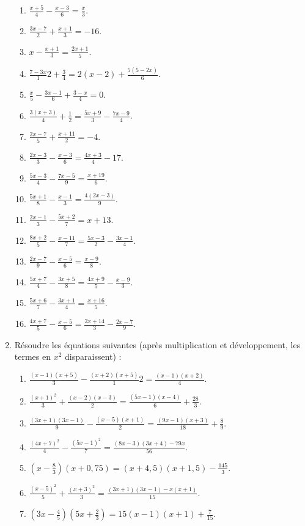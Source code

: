 \documentclass[12 pt]{extarticle}
\theoremstyle{plain}
\begin{document}
\begin{enumerate}
\begin{enumerate}
\item $\frac{x+5}4 - \frac{x-3}6 = \frac{x}3$. 
\item $\frac{3x-7}2 + \frac{x+1}3 = -16$. 
\item $x-\frac{x+1}3 = \frac{2x+1}5$. 
\item $\frac{7-3x}12 + \frac34 = 2(x-2) + \frac{5(5-2x)}6$. 
\item $\frac{x}5 - \frac{3x-1}6 + \frac{3-x}4 = 0$.
\item $\frac{3(x+3)}4 + \frac12 = \frac{5x+9}3 - \frac{7x-9}4$. 
\item $\frac{2x-7}5 + \frac{x+11}2 = -4$. 
\item $\frac{2x-3}3 - \frac{x-3}6 = \frac{4x+3}4 - 17$. 
\item $\frac{5x-3}4 - \frac{7x-5}9 = \frac{x+19}6$. 
\item $\frac{5x+1}8-\frac{x-1}3 = \frac{4(2x-3)}9$. 
\item $\frac{2x-1}3 - \frac{5x+2}7 = x +13$. 
\item $\frac{8x+2}5 - \frac{x-11}7 = \frac{5x-3}2 - \frac{3x-1}4$.
\item $\frac{2x-7}9 - \frac{x-5}6 = \frac{x-9}8$. 
\item $\frac{5x+7}4 - \frac{3x+5}8 = \frac{4x+9}5 - \frac{x-9}3$. 
\item $\frac{5x+6}7 - \frac{3x+1}4 = \frac{x+16}5$. 
\item $\frac{4x+7}5 -\frac{x-5}6 = \frac{2x+14}3 - \frac{2x-7}9$. 
\end{enumerate}
\item Résoudre les équations suivantes (après multiplication et développement, les termes en $x^2$ disparaissent) : 
\begin{enumerate}
\item $\frac{(x-1)(x+5)}3 - \frac{(x+2)(x+5)}12 = \frac{(x-1)(x+2)}4$.
\item $\frac{(x+1)^2}3 + \frac{(x-2)(x-3)}2 = \frac{(5x-1)(x-4)}6 + \frac{28}3$. 
\item $\frac{(3x+1)(3x-1)}9 - \frac{(x-5)(x+1)}2 = \frac{(9x-1)(x+3)}{18} + \frac89$. 
\item $\frac{(4x+7)^2}4 - \frac{(5x-1)^2}7 = \frac{(8x-3)(3x+4)-79x}{56}$. 
\item $\left(x-\frac83\right)(x+0,75) = (x+4,5)(x+1,5) - \frac{145}3$. 
\item $\frac{(x-5)^2}5 + \frac{(x+3)^2}3 = \frac{(3x+1)(3x-1)-x(x+1)}{15}$. 
\item $\left(3x-\frac45\right)\left(5x+\frac23\right)
=15 (x-1)(x+1)+\frac7{15}$. 
\end{enumerate}
\end{enumerate}
\end{document}
